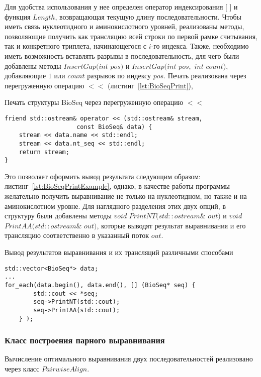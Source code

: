 Для удобства использования у нее определен оператор индексирования [ ] и функция $Length$, возвращающая текущую длину последовательности. Чтобы иметь связь нуклеотидного и аминокислотного уровней, реализованы методы, позволяющие получить как трансляцию всей строки по первой рамке считывания, так и конкретного триплета, начинающегося с $i$-го индекса. Также, необходимо иметь возможность вставлять разрывы в последовательность, для чего были добавлены методы $InsertGap(int$ $pos)$ и $InsertGap(int$ $pos,$ $int$ $count)$, добавляющие $1$ или $count$ разрывов по индексу $pos$. Печать реализована через перегруженную операцию $<<$ (листинг~\ref{lst:BioSeqPrint}),
\begin{algorithm}
	\caption{Печать структуры BioSeq через перегруженную операцию $<<$} \label{lst:BioSeqPrint}
	\begin{lstlisting}
friend std::ostream& operator << (std::ostream& stream, 
					const BioSeq& data) {
	stream << data.name << std::endl;
	stream << data.nt_seq << std::endl;
	return stream;
}
	\end{lstlisting}
\end{algorithm}

Это позволяет оформить вывод результата следующим образом: листинг~\ref{lst:BioSeqPrintExample}, однако, в качестве работы программы желательно получить выравнивание не только на нуклеотидном, но также и на аминокислотном уровне. Для наглядного разделения этих двух опций, в структуру были добавлены методы $void$ $PrintNT(std::ostream\&$ $out)$ и $void$ $PrintAA(std::ostream\&$ $out)$, которые выводят результат выравнивания и его трансляцию соответственно в указанный поток $out$.
\begin{algorithm}
	\caption{Вывод результатов выравнивания и их трансляций различными способами} \label{lst:BioSeqPrintExample}
	\begin{lstlisting}
std::vector<BioSeq*> data; 
...
for_each(data.begin(), data.end(), [] (BioSeq* seq) { 
		std::cout << *seq; 
		seq->PrintNT(std::cout);
		seq->PrintAA(std::cout);
	} );
	\end{lstlisting}
\end{algorithm}


\subsubsection[Класс построения парного выравнивания]{\large Класс построения парного выравнивания}
\hspace{\parindent} Вычисление оптимального выравнивания двух последовательностей реализовано через  класс $PairwiseAlign$.


